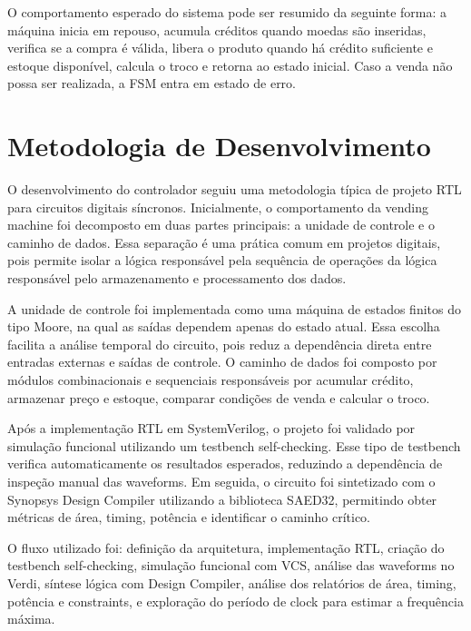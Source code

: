 \documentclass[11pt,a4paper]{article}
\begin{document}
O comportamento esperado do sistema pode ser resumido da seguinte forma: a máquina inicia em repouso, acumula créditos quando moedas são inseridas, verifica se a compra é válida, libera o produto quando há crédito suficiente e estoque disponível, calcula o troco e retorna ao estado inicial. Caso a venda não possa ser realizada, a FSM entra em estado de erro.

\section{Metodologia de Desenvolvimento}

O desenvolvimento do controlador seguiu uma metodologia típica de projeto RTL para circuitos digitais síncronos. Inicialmente, o comportamento da vending machine foi decomposto em duas partes principais: a unidade de controle e o caminho de dados. Essa separação é uma prática comum em projetos digitais, pois permite isolar a lógica responsável pela sequência de operações da lógica responsável pelo armazenamento e processamento dos dados.

A unidade de controle foi implementada como uma máquina de estados finitos do tipo Moore, na qual as saídas dependem apenas do estado atual. Essa escolha facilita a análise temporal do circuito, pois reduz a dependência direta entre entradas externas e saídas de controle. O caminho de dados foi composto por módulos combinacionais e sequenciais responsáveis por acumular crédito, armazenar preço e estoque, comparar condições de venda e calcular o troco.

Após a implementação RTL em SystemVerilog, o projeto foi validado por simulação funcional utilizando um testbench self-checking. Esse tipo de testbench verifica automaticamente os resultados esperados, reduzindo a dependência de inspeção manual das waveforms. Em seguida, o circuito foi sintetizado com o Synopsys Design Compiler utilizando a biblioteca SAED32, permitindo obter métricas de área, timing, potência e identificar o caminho crítico.

O fluxo utilizado foi: definição da arquitetura, implementação RTL, criação do testbench self-checking, simulação funcional com VCS, análise das waveforms no Verdi, síntese lógica com Design Compiler, análise dos relatórios de área, timing, potência e constraints, e exploração do período de clock para estimar a frequência máxima.
\end{document}
